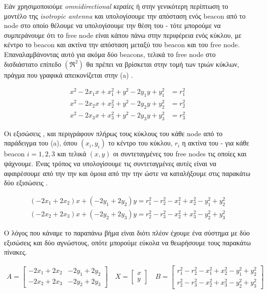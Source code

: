 Εάν χρησιμοποιούμε \emph{omnidirectional κεραίες} \cite{Omnidirectional-antenna} ή στην γενικότερη περίπτωση το μοντέλο της \emph{isotropic antenna} \cite{Isotropic-radiator} και υπολογίσουμε την απόσταση ενός beacon από το node στο οποίο θέλουμε να υπολογίσουμε την θέση του -
τότε μπορούμε να συμπεράνουμε ότι το free node είναι κάπου πάνω στην περιφέρεια ενός 
κύκλου, με κέντρο το beacon και ακτίνα την απόσταση μεταξύ του beacon και του free node. 
Επαναλαμβάνοντας αυτό για ακόμα δύο beacons, τελικά το free node στο δισδιάστατο επίπεδο $(\mathfrak{R}^2)$ θα πρέπει να βρίσκεται στην τομή των τριών κύκλων, πράγμα που γραφικά 
απεικονίζεται στην  (a) \cite{RSSI-trilateration-Range_based}.

\begin{align}
	x^2-2 x_1 x + x_1^2 + y^2-2 y_1 y + y_1^2 &= r_1^2 \label{eq:trilateration-b1} \\ 
	x^2-2 x_2 x + x_2^2 + y^2-2 y_2 y + y_2^2 &= r_2^2 \label{eq:trilateration-b2} \\
	x^2-2 x_3 x + x_3^2 + y^2-2 y_3 y + y_3^2 &= r_3^2 \label{eq:trilateration-b3} 
\end{align}

Οι εξισώσεις ,  και  περιγράφουν πλήρως τους κύκλους του κάθε node από το παράδειγμα 
του  (a),
όπου $(x_i,y_i)$ το κέντρο του κύκλου, $r_i$ η ακτίνα του - για κάθε beacon $i=1,2,3$ και τελικά $(x,y)$ οι συντεταγμένες του free nodes τις οποίες και ψάχνουμε. 
Ένας τρόπος να υπολογίσουμε τις συντεταγμένες αυτές είναι να αφαιρέσουμε από την  την  και όμοια από την 
 την  ώστε να καταλήξουμε στις παρακάτω δύο εξισώσεις \cite{trilateration-equations} \cite{localization-algorithms-for-wsn}.

\begin{align}
	(-2x_1+2x_2)x + (-2y_1+2y_2)y = r_1^2 - r_2^2 - x_1^2 + x_2^2 - y_1^2 + y_2^2  \nonumber \\
	(-2x_2+2x_3)x + (-2y_2+2y_3)y = r_2^2 - r_3^2 - x_2^2 + x_3^2 - y_2^2 + y_3^2  \nonumber
\end{align}

Ο λόγος που κάναμε το παραπάνω βήμα είναι διότι πλέον έχουμε ένα σύστημα με δύο εξισώσεις και δύο αγνώστους, οπότε μπορούμε εύκολα να θεωρήσουμε τους παρακάτω πίνακες.

\begin{align}
	A = \begin{bmatrix} -2x_1+2x_2 & -2y_1+2y_2 \\ -2x_2+2x_3 & -2y_2+2y_3 \end{bmatrix} \nonumber \quad
	X = \begin{bmatrix} x \\ y \end{bmatrix} \nonumber \quad
	B = \begin{bmatrix} r_1^2 - r_2^2 - x_1^2 + x_2^2 - y_1^2 + y_2^2 \\ r_2^2 - r_3^2 - x_2^2 + x_3^2 - y_2^2 + y_3^2 \end{bmatrix} \nonumber
\end{align}


